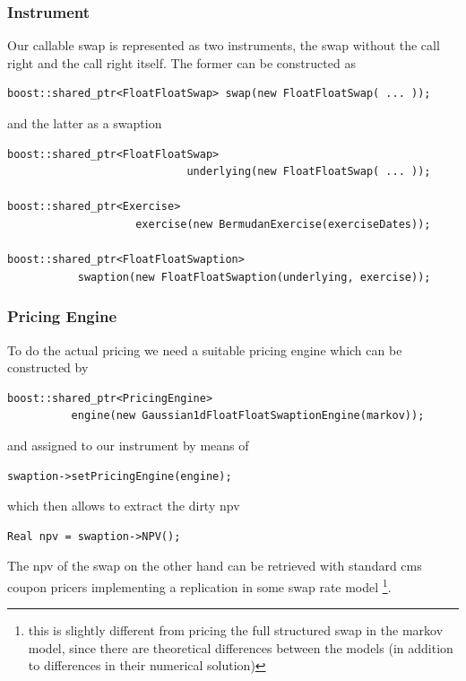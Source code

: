 \documentclass{beamer}
\begin{document}
\begin{frame}[fragile]
\frametitle{Instrument}
Our callable swap is represented as two instruments, the swap without the call right and the call right itself.
The former can be constructed as

\begin{verbatim}
boost::shared_ptr<FloatFloatSwap> swap(new FloatFloatSwap( ... ));
\end{verbatim}

and the latter as a swaption

\begin{verbatim}
boost::shared_ptr<FloatFloatSwap> 
                            underlying(new FloatFloatSwap( ... ));

boost::shared_ptr<Exercise> 
                    exercise(new BermudanExercise(exerciseDates));

boost::shared_ptr<FloatFloatSwaption> 
           swaption(new FloatFloatSwaption(underlying, exercise));
\end{verbatim}

\end{frame}


\begin{frame}[fragile]
\frametitle{Pricing Engine}
To do the actual pricing we need a suitable pricing engine which can be constructed by
\begin{verbatim}
boost::shared_ptr<PricingEngine> 
          engine(new Gaussian1dFloatFloatSwaptionEngine(markov));
\end{verbatim}
and assigned to our instrument by means of
\begin{verbatim}
swaption->setPricingEngine(engine);
\end{verbatim}

which then allows to extract the dirty npv

\begin{verbatim}
Real npv = swaption->NPV();
\end{verbatim}

The npv of the swap on the other hand can be retrieved with standard cms coupon pricers implementing
a replication in some swap rate model
\footnote{this is slightly different from pricing the full structured swap in the markov model,
since there are theoretical differences between the models (in addition to differences in their numerical solution)}.
\end{frame}
\end{document}
